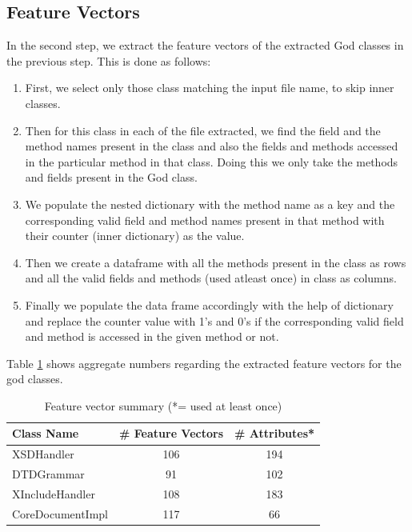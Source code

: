 \documentclass{article}
\begin{document}
\subsection{Feature Vectors}
In the second step, we extract the feature vectors of the extracted God classes in the previous step. This is done as follows:
\begin{enumerate}
    \item First, we select only those class matching the input file name, to skip inner classes.
    \item Then for this class in each of the file extracted, we find the field and 
    the method names present in the class and also the fields and methods accessed in the particular method in that class.
    Doing this we only take the methods and fields present in the God class.
    \item We populate the nested dictionary with the method name as a key and the corresponding valid field and method names present in that method with their counter (inner dictionary) as the value. 
    \item Then we create a dataframe with all the methods present in the class as rows and all the valid fields and methods (used atleast once) in class as columns.
    \item Finally we populate the data frame accordingly with the help of dictionary and replace the counter value with 1's and 0's if the corresponding valid field and method is accessed in the given method or not.
\end{enumerate}

Table \ref{tab:feat_vec} shows aggregate numbers regarding the extracted feature vectors for the god classes.
\begin{table}[]
    \centering
    \begin{tabular}{lcc}
        \hline
        \textbf{Class Name} &\textbf{\# Feature Vectors} & \textbf{\# Attributes*}\\
        \hline\hline
        {XSDHandler} & {106} & {194}\\
        {DTDGrammar} & {91} & {102}\\
        {XIncludeHandler} & {108} & {183}\\
        {CoreDocumentImpl} & {117} & {66}\\
        \hline
    \end{tabular}
    \caption{Feature vector summary (*= used at least once)}
    \label{tab:feat_vec}
\end{table}
\end{document}

